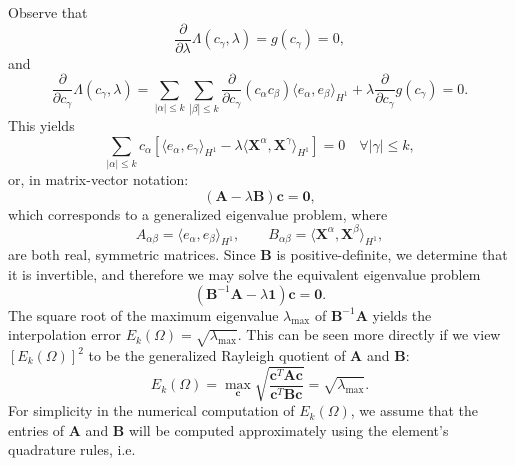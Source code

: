 Observe that
\begin{equation}
        \frac{\partial}{\partial \lambda} \Lambda (c_\gamma, \lambda) = g(c_\gamma) = 0,
\end{equation}
and
\begin{equation}
        \frac{\partial}{\partial c_\gamma} \Lambda (c_\gamma, \lambda) = \sum_{|\alpha| \leq k} \sum_{|\beta| \leq k} \frac{\partial}{\partial c_\gamma} (c_{\alpha} c_{\beta}) \langle e_\alpha, e_\beta \rangle_{H^1} + \lambda \frac{\partial}{\partial c_\gamma} g(c_\gamma) = 0.
\end{equation}
This yields
\begin{equation}
        \sum_{|\alpha| \leq k} c_{\alpha} \left[ \langle e_\alpha, e_\gamma \rangle_{H^1} - \lambda \langle \mathbf{X}^\alpha, \mathbf{X}^\gamma \rangle_{H^1} \right] = 0 \quad \forall |\gamma| \leq k,
\end{equation}
or, in matrix-vector notation:
\begin{equation}
        (\mathbf{A} - \lambda \mathbf{B}) \mathbf{c} = \mathbf{0},
\end{equation}
which corresponds to a generalized eigenvalue problem, where
\begin{equation}
        A_{\alpha \beta} = \langle e_\alpha, e_\beta \rangle_{H^1}, \qquad B_{\alpha \beta} = \langle \mathbf{X}^\alpha, \mathbf{X}^\beta \rangle_{H^1},
\end{equation}
are both real, symmetric matrices. Since $\mathbf{B}$ is positive-definite, we determine that it is invertible, and therefore we may solve the equivalent eigenvalue problem
\begin{equation}
        (\mathbf{B}^{-1} \mathbf{A} - \lambda \mathbf{1}) \mathbf{c} = \mathbf{0}.
\end{equation}
The square root of the maximum eigenvalue $\lambda_{\max}$ of $\mathbf{B}^{-1} \mathbf{A}$ yields the interpolation error $E_k (\Omega) = \sqrt{\lambda_{\max}}$. This can be seen more directly if we view $\left[ E_k (\Omega) \right]^2$ to be the generalized Rayleigh quotient of $\mathbf{A}$ and $\mathbf{B}$:
\begin{equation}
        E_k (\Omega) = \max_{\mathbf{c}} \sqrt{\frac{\mathbf{c}^T \mathbf{A} \mathbf{c}}{\mathbf{c}^T \mathbf{B} \mathbf{c}}} = \sqrt{\lambda_{\max}}.
\end{equation}
For simplicity in the numerical computation of $E_k (\Omega)$, we assume that the entries of $\mathbf{A}$ and $\mathbf{B}$ will be computed approximately using the element's quadrature rules, i.e.
